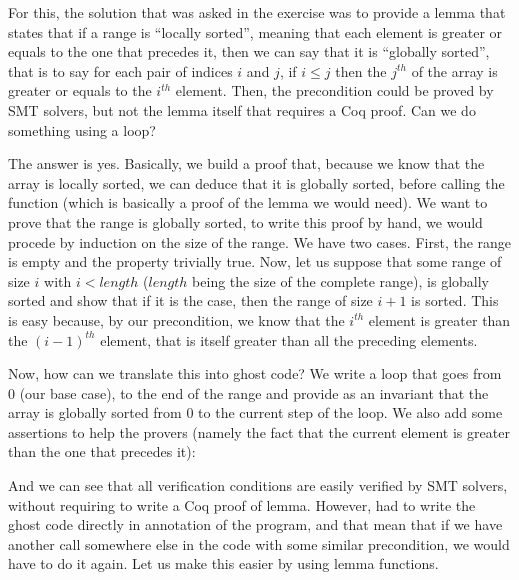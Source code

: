 


For this, the solution that was asked in the exercise was to provide a lemma
that states that if a range is ``locally sorted'', meaning that each element
is greater or equals to the one that precedes it, then we can say that it is
``globally sorted'', that is to say for each pair of indices $i$ and $j$, if
$i \leq j$ then the $j^{th}$ of the array is greater or equals to the $i^{th}$
element. Then, the precondition could be proved by SMT solvers, but not the
lemma itself that requires a Coq proof. Can we do something using a loop?



The answer is yes. Basically, we build a proof that, because we know that the
array is locally sorted, we can deduce that it is globally sorted, before
calling the function (which is basically a proof of the lemma we would need).
We want to prove that the range is globally sorted, to write this proof by hand,
we would procede by induction on the size of the range. We have two cases.
First, the range is empty and the property trivially true. Now, let us suppose
that some range of size $i$ with $i < length$ ($length$ being the size of the
complete range), is globally sorted and show that if it is the case, then the
range of size $i+1$ is sorted. This is easy because, by our precondition, we
know that the $i^{th}$ element is greater than the $(i-1)^{th}$ element, that is
itself greater than all the preceding elements.




Now, how can we translate this into ghost code? We write a loop that goes from
$0$ (our base case), to the end of the range  and provide as an
invariant that the array is globally sorted from $0$ to the current step of the
loop. We also add some assertions to help the provers (namely the fact that the
current element is greater than the one that precedes it):






And we can see that all verification conditions are easily verified by SMT
solvers, without requiring to write a Coq proof of lemma. However, had to write
the ghost code directly in annotation of the program, and that mean that if we
have another call somewhere else in the code with some similar precondition, we
would have to do it again. Let us make this easier by using lemma functions.







